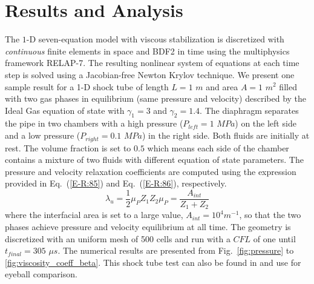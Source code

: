\documentclass{anstrans}
\newcommand{\eqt}[1]{Eq.~(\ref{#1})}                     %
\newcommand{\fig}[1]{Fig.~\ref{#1}}                      %
\begin{document}
\section{Results and Analysis}

The $1$-D seven-equation model with viscous stabilization is discretized with {\it continuous} finite elements in space and BDF2 in time using the multiphysics framework RELAP-7. The resulting nonlinear system of equations at each time step is solved using a Jacobian-free Newton Krylov technique. We present one sample result for a 1-D shock tube of length $L=1$ $m$ and area $A=1$ $m^2$ filled with two gas phases in equilibrium (same pressure and velocity) described by the Ideal Gas equation of state with $\gamma_1 = 3$ and $\gamma_2 = 1.4$. The diaphragm separates the pipe in two chambers with a high pressure ($P_{left} = 1$ $MPa$) on the left side and a low pressure ($P_{right} = 0.1$ $MPa$) in the right side. Both fluids are initially at rest. The volume fraction is set to $0.5$ which means each side of the chamber contains a mixture of two fluids with different equation of state parameters. The pressure and velocity relaxation coefficients are computed using the expression provided in \eqt{E-R:85} and \eqt{E-R:86}, respectively. 
%
\begin{subequations}
\begin{equation}\label{E-R:85}
  \lambda_u = \frac{1}{2} \mu_P Z_{1} Z_{2}
\end{equation}
\begin{equation}\label{E-R:86}
  \mu_P = \frac{A_{int}}{Z_{1}+Z_{2}}
\end{equation}
\end{subequations}
%
where the interfacial area is set to a large value, $A_{int} = 10^4 m^{-1}$, so that the two phases achieve pressure and velocity equilibrium at all time. The geometry is discretized with an uniform mesh of 500 cells and run with a $CFL$ of one until $t_{final} = 305$ $\mu s$. The numerical results are presented from \fig{fig:pressure} to \ref{fig:viscosity_coeff_beta}. This shock tube test can also be found in \cite{Saurel_2007} and use for eyeball comparison.\\
\end{document}
